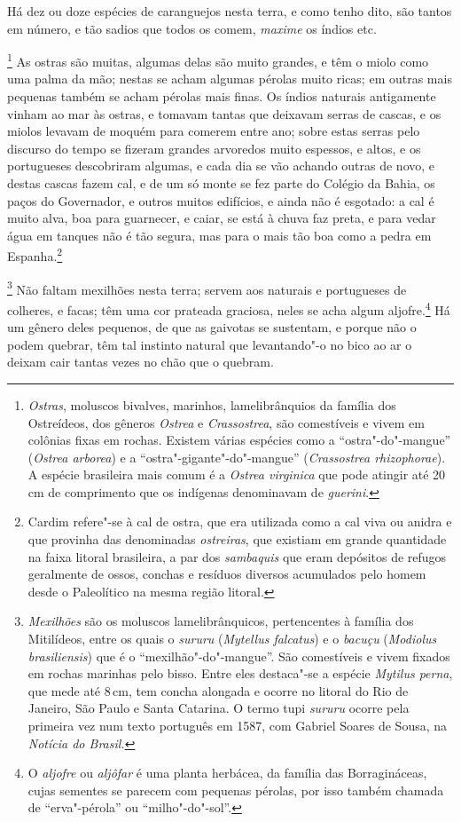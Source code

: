 \begin{linenumbers}
 Há dez ou doze espécies de caranguejos nesta terra, e como tenho dito,
são tantos em número, e tão sadios que todos os comem, \textit{maxime} os
índios etc.

\footnote{ \textit{Ostras}, moluscos bivalves,
marinhos, lamelibrânquios da família dos Ostreídeos, dos gêneros
\textit{Ostrea} e \textit{Crassostrea}, são comestíveis e vivem em
colônias fixas em rochas. Existem várias espécies como a
``ostra"-do"-mangue'' (\textit{Ostrea arborea}) e a ``ostra"-gigante"-do"-mangue'' 
(\textit{Crassostrea rhizophorae}). A espécie
brasileira mais comum é a \textit{Ostrea virginica} que pode atingir
até 20\,cm de comprimento que os indígenas denominavam de \textit{guerini}.} 
As ostras são muitas, algumas delas são muito grandes,
e têm o miolo como uma palma da mão; nestas se acham algumas pérolas
muito ricas; em outras mais pequenas também se acham pérolas mais
finas. Os índios naturais antigamente vinham ao mar às ostras, e
tomavam tantas que deixavam serras de cascas, e os miolos levavam de
moquém para comerem entre ano; sobre estas serras pelo discurso do
tempo se fizeram grandes arvoredos muito espessos, e altos, e os
portugueses descobriram algumas, e cada dia se vão achando outras de
novo, e destas cascas fazem cal, e de um só monte se fez parte do
Colégio da Bahia, os paços do Governador, e outros muitos edifícios, e
ainda não é esgotado: a cal é muito alva, boa para guarnecer, e caiar,
se está à chuva faz preta, e para vedar água em tanques não é tão
segura, mas para o mais tão boa como a pedra em Espanha.\footnote{ Cardim 
refere"-se à cal de ostra, que era utilizada como a cal viva ou
anidra e que provinha das denominadas \textit{ostreiras}, que existiam
em grande quantidade na faixa litoral brasileira, a par dos
\textit{sambaquis} que eram depósitos de refugos geralmente de ossos,
conchas e resíduos diversos acumulados pelo homem desde o Paleolítico
na mesma região litoral.} 

\footnote{ \textit{Mexilhões} são os moluscos
lamelibrânquicos, pertencentes à família dos Mitilídeos, entre os quais
o \textit{sururu} (\textit{Mytellus falcatus}) e o \textit{bacuçu} (\textit{Modiolus
brasiliensis}) que é o ``mexilhão"-do"-mangue''. São comestíveis e vivem
fixados em rochas marinhas pelo bisso. Entre eles destaca"-se a espécie
\textit{Mytilus perna}, que mede até 8\,cm, tem concha alongada e ocorre
no litoral do Rio de Janeiro, São Paulo e Santa Catarina. O termo tupi
\textit{sururu} ocorre pela primeira vez num texto português em 1587,
com Gabriel Soares de Sousa, na \textit{Notícia do Brasil.}} 
Não faltam mexilhões nesta terra; servem aos naturais e portugueses de
colheres, e facas; têm uma cor prateada graciosa, neles se acha algum
aljofre.\footnote{ O \textit{aljofre} ou \textit{aljôfar} é uma planta
herbácea, da família das Borragináceas, cujas sementes se parecem com
pequenas pérolas, por isso também chamada de ``erva"-pérola'' ou
``milho"-do"-sol''.} Há um gênero deles pequenos, de que as gaivotas se
sustentam, e porque não o podem quebrar, têm tal instinto natural que
levantando"-o no bico ao ar o deixam cair tantas vezes no chão que o quebram. 


\end{linenumbers}
